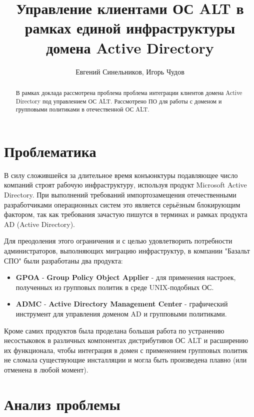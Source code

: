 \author{Евгений Синельников, Игорь Чудов}
\title{Управление клиентами ОС ALT в рамках единой инфраструктуры
домена Active Directory}
\maketitle

\begin{abstract}
  В рамках доклада рассмотрена проблема проблема интеграции клиентов
  домена Active Directory под управлением ОС ALT. Рассмотрено ПО для
  работы с доменом и групповыми политиками в отечественной ОС ALT.
\end{abstract}


\section{Проблематика}

В силу сложившейся за длительное время конъюнктуры подавляющее число компаний
строят рабочую инфраструктуру, используя продукт Microsoft Active
Directory. При выполнений требований импортозамещения отечественными
разработчиками операционных систем это является серьёзным блокирующим
фактором, так как требования зачастую пишутся в терминах и рамках
продукта AD (Active Directory).

Для преодоления этого ограничения и с целью удовлетворить потребности
администраторов, выполняющих миграцию инфраструктур, в компании
"Базальт СПО" были разработаны два продукта:

\begin{itemize}
\item \textbf{GPOA} - \textbf{Group Policy Object Applier} - для применения
настроек, полученных из групповых политик в среде UNIX-подобных ОС.
\item \textbf{ADMC} - \textbf{Active Directory Management Center} -
графический инструмент для управления доменом AD и групповыми политиками.
\end{itemize}

Кроме самих продуктов была проделана большая работа по устранению
несостыковок в различных компонентах дистрибутивов ОС ALT и расширению
их функционала, чтобы интеграция в домен с применением групповых
политик не сломала существующие инсталляции и могла быть произведена
плавно (или отменена в любой момент).

\section{Анализ проблемы}

